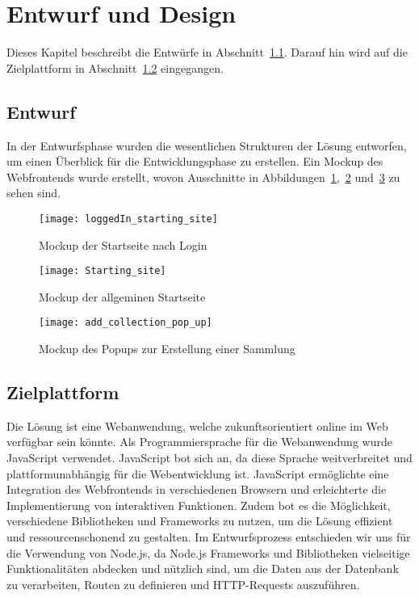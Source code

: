 \section{Entwurf und Design}\label{sec:entwurf-und-design}

Dieses Kapitel beschreibt die Entwürfe in Abschnitt~\ref{subsec:entwurf}.
Darauf hin wird auf die Zielplattform in Abschnitt~\ref{subsec:zielplattform} eingegangen.

\subsection{Entwurf}\label{subsec:entwurf}

In der Entwurfsphase wurden die wesentlichen Strukturen der Lösung entworfen, um einen Überblick für die Entwicklungsphase zu erstellen.
Ein Mockup des Webfrontends wurde erstellt, wovon Ausschnitte in Abbildungen~\ref{fig:mockup1},~\ref{fig:mockup2} und~\ref{fig:mockup3} zu sehen sind.

\begin{figure}[h]
    \centering
    \texttt{[image: loggedIn\_starting\_site]}
    \caption{Mockup der Startseite nach Login}
    \label{fig:mockup1}
\end{figure}

\begin{figure}[h]
    \centering
    \texttt{[image: Starting\_site]}
    \caption{Mockup der allgeminen Startseite}
    \label{fig:mockup2}
\end{figure}

\begin{figure}[h]
    \centering
    \texttt{[image: add\_collection\_pop\_up]}
    \caption{Mockup des Popups zur Erstellung einer Sammlung}
    \label{fig:mockup3}
\end{figure}

\subsection{Zielplattform}\label{subsec:zielplattform}

Die Lösung ist eine Webanwendung, welche zukunftsorientiert online im Web verfügbar sein könnte.
Als Programmiersprache für die Webanwendung wurde JavaScript verwendet.
JavaScript bot sich an, da diese Sprache weitverbreitet und plattformunabhängig für die Webentwicklung ist.
JavaScript ermöglichte eine Integration des Webfrontends in verschiedenen Browsern und erleichterte die Implementierung von interaktiven Funktionen.
Zudem bot es die Möglichkeit, verschiedene Bibliotheken und Frameworks zu nutzen, um die Lösung effizient und ressourcenschonend zu gestalten.
Im Entwurfsprozess entschieden wir uns für die Verwendung von Node.js, da Node.js Frameworks und Bibliotheken vielseitige Funktionalitäten abdecken und nützlich sind, um die Daten aus der Datenbank zu verarbeiten, Routen zu definieren und HTTP-Requests auszuführen.

